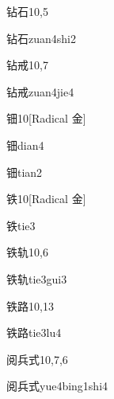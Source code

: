 \begin{entry}{钻石}{10,5}
  \begin{phonetics}{钻石}{zuan4shi2}
  \end{phonetics}
\end{entry}

\begin{entry}{钻戒}{10,7}
  \begin{phonetics}{钻戒}{zuan4jie4}
  \end{phonetics}
\end{entry}

\begin{entry}{钿}{10}[Radical 金]
  \begin{phonetics}{钿}{dian4}
  \end{phonetics}
  \begin{phonetics}{钿}{tian2}
  \end{phonetics}
\end{entry}

\begin{entry}{铁}{10}[Radical 金]
  \begin{phonetics}{铁}{tie3}
  \end{phonetics}
\end{entry}

\begin{entry}{铁轨}{10,6}
  \begin{phonetics}{铁轨}{tie3gui3}
  \end{phonetics}
\end{entry}

\begin{entry}{铁路}{10,13}
  \begin{phonetics}{铁路}{tie3lu4}
  \end{phonetics}
\end{entry}

\begin{entry}{阅兵式}{10,7,6}
  \begin{phonetics}{阅兵式}{yue4bing1shi4}
  \end{phonetics}
\end{entry}

